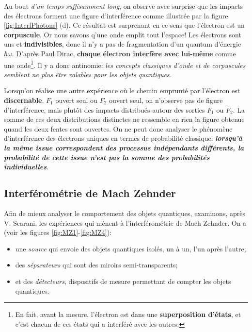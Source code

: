 Au bout \emph{d'un temps suffisamment long}, on observe avec surprise que les
impacts des électrons forment une figure d'interférence comme illustrée par la
figure \ref{fig:InterfPhotons} (d). Ce résultat est surprenant en ce sens que
l'électron est un \textbf{corpuscule}. Or nous savons q'une onde emplit tout
l'espace! Les électrons sont uns et \textbf{indivisibles}, donc il n'y a pas de
fragmentation d'un quantum d'énergie $\hbar\omega$. D'après Paul Dirac,
\textbf{chaque électron interfère avec lui-même} comme une onde\footnote{En
fait, avant la mesure, l'électron est dans une \textbf{superposition d'états},
et c'est chacun de ces états qui a interféré avec les autres.}. Il y a donc
antinomie: \emph{les concepts classiques d'onde et de corpuscules semblent ne
plus être valables pour les objets quantiques.}

Lorsqu'on réalise une autre expérience où le chemin emprunté par l'électron est
\textbf{discernable}, $F_1$ ouvert seul ou $F_2$ ouvert seul, on n'observe
pas de figure d'interférence, mais plutôt des impacts distribués autour des
sorties $F_1$ ou $F_2$. La somme de ces deux distributions distinctes ne
ressemble en rien la figure obtenue quand les deux fentes sont ouvertes. On ne
peut donc analyser le phénomène d'interférence des électrons uniques en termes
de probabilité classique: \textbf{\emph{lorsqu'à la même issue correspondent des
processus indépendants différents, la probabilité de cette issue n'est pas la
somme des probabilités individuelles}}.

\subsection{Interférométrie de Mach Zehnder}
\label{sec:InterfMZ}

Afin de mieux analyser le comportement des objets quantiques, examinons, après
V. Scarani\cite{VSC2004}, les expériences qui mènent à l'interférométrie de Mach
Zehnder. On a (voir les figures \ref{fig:MZ1}-\ref{fig:MZ4}):
\begin{itemize}
\item une \emph{source} qui envoie des objets quantiques isolés, un à un, l'un
après l'autre;

\item des \emph{séparateurs} qui sont des miroirs semi-transparents;

 \item et des \emph{détecteurs}, dispositifs de mesure permettant de compter les
objets quantiques.
\end{itemize}

